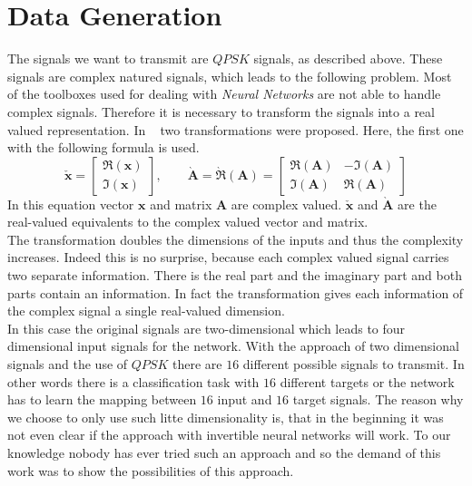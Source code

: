 \documentclass[oneside]{msvreport}%
\newcommand{\e}[1]{\emph{#1}}
\begin{document}
\section{Data Generation}\label{datagen}
The signals we want to transmit are $QPSK$ signals, as described above. These signals are complex natured signals, which leads to the following problem. Most of the toolboxes used for dealing with \e{Neural Networks} are not able to handle complex signals. Therefore it is necessary to transform the signals into a real valued representation. In ~\cite{hellings2019measuring} two transformations were proposed. Here, the first one with the following formula is used.
\begin{equation}
  \bm{\check{x}} = \begin{bmatrix}\Re{(\bm{x})} \\ \Im{(\bm{x})}\end{bmatrix}, \qquad  \bm{\grave{A}} = \grave{\Re}(\bm{A}) = \begin{bmatrix}\Re(\bm{A}) & -\Im(\bm{A}) \\ \Im(\bm{A}) & \Re(\bm{A})\end{bmatrix} 
\end{equation}
In this equation vector $\bm{x}$ and matrix $\bm{A}$ are complex valued. $\bm{\check{{x}}}$ and $\bm{\grave{A}}$ are the real-valued equivalents to the complex valued vector and matrix. \\
The transformation doubles the dimensions of the inputs and thus the complexity increases. Indeed this is no surprise, because each complex valued signal carries two separate information. There is the real part and the imaginary part and both parts contain an information. In fact the transformation gives each information of the complex signal a single real-valued dimension.\\ 
In this case the original signals are two-dimensional which leads to four dimensional input signals for the network. With the approach of two dimensional signals and the use of $QPSK$ there are $16$ different possible signals to transmit. In other words there is a classification task with $16$ different targets or the network has to learn the mapping between $16$ input and $16$ target signals. The reason why we choose to only use such litte dimensionality is, that in the beginning it was not even clear if the approach with invertible neural networks will work. To our knowledge nobody has ever tried such an approach and so the demand of this work was to show the possibilities of this approach.\\ 
\end{document}
